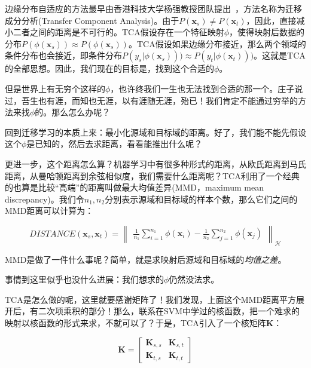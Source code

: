 边缘分布自适应的方法最早由香港科技大学杨强教授团队提出~\cite{pan2011domain}，方法名称为迁移成分分析(Transfer Component Analysis)。由于$P(\mathbf{x}_s) \ne P(\mathbf{x}_t)$，因此，直接减小二者之间的距离是不可行的。TCA假设存在一个特征映射$\phi$，使得映射后数据的分布$P(\phi(\mathbf{x}_s)) \approx P(\phi(\mathbf{x}_s))$。TCA假设如果边缘分布接近，那么两个领域的条件分布也会接近，即条件分布$P(y_s | \phi(\mathbf{x}_s))) \approx P(y_t | \phi(\mathbf{x}_t)))$。这就是TCA的全部思想。因此，我们现在的目标是，找到这个合适的$\phi$。

但是世界上有无穷个这样的$\phi$，也许终我们一生也无法找到合适的那一个。庄子说过，吾生也有涯，而知也无涯，以有涯随无涯，殆已！我们肯定不能通过穷举的方法来找$\phi$的。那么怎么办呢？

回到迁移学习的本质上来：最小化源域和目标域的距离。好了，我们能不能先假设这个$\phi$是已知的，然后去求距离，看看能推出什么呢？

更进一步，这个距离怎么算？机器学习中有很多种形式的距离，从欧氏距离到马氏距离，从曼哈顿距离到余弦相似度，我们需要什么距离呢？TCA利用了一个经典的也算是比较“高端”的距离叫做最大均值差异(MMD，maximum mean discrepancy)。我们令$n_1,n_2$分别表示源域和目标域的样本个数，那么它们之间的MMD距离可以计算为：

\begin{equation}
	\label{eq-distribution-mmd}
	DISTANCE(\mathbf{x}_{s},\mathbf{x}_{t})= \begin{Vmatrix} \frac{1}{n_1} \sum \limits_{i=1}^{n_1} \phi(\mathbf{x}_{i}) - \frac{1}{n_2}\sum \limits _{j=1}^{n_2} \phi(\mathbf{x}_{j}) \end{Vmatrix}_{\mathcal{H}}
\end{equation}

MMD是做了一件什么事呢？简单，就是求映射后源域和目标域的\textit{均值之差}。

事情到这里似乎也没什么进展：我们想求的$\phi$仍然没法求。

TCA是怎么做的呢，这里就要感谢矩阵了！我们发现，上面这个MMD距离平方展开后，有二次项乘积的部分！那么，联系在SVM中学过的核函数，把一个难求的映射以核函数的形式来求，不就可以了？于是，TCA引入了一个核矩阵$\mathbf{K}$：

\begin{equation}
	\mathbf{K}=\begin{bmatrix}\mathbf{K}_{s,s} & \mathbf{K}_{s,t}\\\mathbf{K}_{t,s} & \mathbf{K}_{t,t}\end{bmatrix} 
\end{equation}

